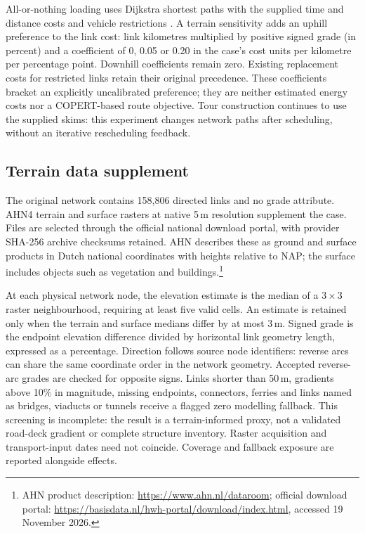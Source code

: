 All-or-nothing loading uses Dijkstra shortest paths with the supplied time and
distance costs and vehicle restrictions \parencite{dijkstra1959}. A terrain sensitivity adds an uphill
preference to the link cost: link kilometres multiplied by positive signed
grade (in percent) and a coefficient of 0, 0.05 or 0.20 in the case's cost units
per kilometre per percentage point. Downhill coefficients remain zero.
Existing replacement costs for restricted links retain their original
precedence. These coefficients bracket an explicitly uncalibrated preference;
they are neither estimated energy costs nor a COPERT-based route objective.
Tour construction continues to use the supplied skims: this experiment changes
network paths after scheduling, without an iterative rescheduling feedback.

\subsection{Terrain data supplement}
The original network contains 158,806 directed links and no grade attribute.
AHN4 terrain and surface rasters at native 5\,m resolution supplement the case.
Files are selected through the official national download portal, with
provider SHA-256 archive checksums retained. AHN describes these as ground and
surface products in Dutch national coordinates with heights relative to NAP;
the surface includes objects such as vegetation and buildings.\footnote{AHN
product description: \url{https://www.ahn.nl/dataroom}; official download portal:
\url{https://basisdata.nl/hwh-portal/download/index.html}, accessed 19 November
2026.}

At each physical network node, the elevation estimate is the median of a
$3\times3$ raster neighbourhood, requiring at least five valid cells.
An estimate is retained only when the terrain and surface medians differ by
at most 3\,m. Signed grade is the endpoint elevation difference divided by
horizontal link geometry length, expressed as a percentage. Direction follows
source node identifiers: reverse arcs can share the same coordinate order in
the network geometry. Accepted reverse-arc grades are checked for opposite signs.
Links shorter than 50\,m, gradients above 10\% in magnitude, missing endpoints,
connectors, ferries and links named as bridges, viaducts or tunnels receive a
flagged zero modelling fallback. This screening is incomplete: the result is
a terrain-informed proxy, not a validated road-deck gradient or complete
structure inventory. Raster acquisition and transport-input dates need not
coincide. Coverage and fallback exposure are reported alongside effects.


